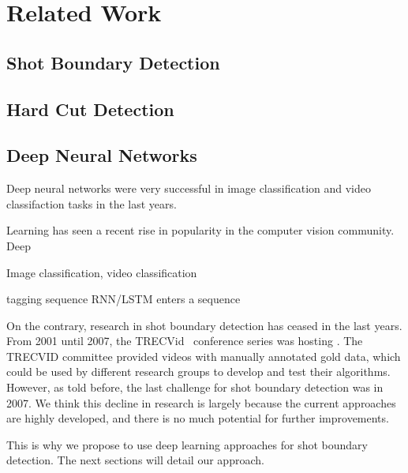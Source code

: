 \section{Related Work}
\label{sec:related_work}

\subsection{Shot Boundary Detection}

\subsection{Hard Cut Detection}

\subsection{Deep Neural Networks}
Deep neural networks were very successful in image classification and video classifaction tasks in the last years.

Learning has seen a recent rise in popularity in the computer vision community.
Deep 

Image classification, video classification

tagging sequence
RNN/LSTM
enters a sequence


On the contrary, research in shot boundary detection has ceased in the last years.
From 2001 until 2007, the TRECVid~\cite{trecvid} conference series was hosting .
The TRECVID committee provided videos with manually annotated gold data, which could be used by different research groups to develop and test their algorithms.
However, as told before, the last challenge for shot boundary detection was in 2007.
We think this decline in research is largely because the current approaches are highly developed, and there is no much potential for further improvements.

This is why we propose to use deep learning approaches for shot boundary detection.
The next sections will detail our approach. 

